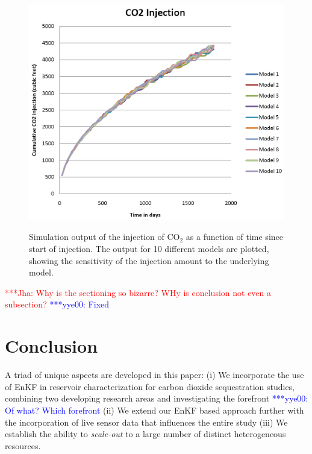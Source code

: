 \documentclass{acm_proc_article-sp}
\newcommand{\jhanote}[1]{ {\textcolor{red} { ***Jha: #1 }}}
\newcommand{\yyenote}[1]{ {\textcolor{blue} { ***yye00: #1 }}}
\newcommand{\jhanote}[1]{}
\newcommand{\yyenote}[1]{}
\begin{document}
\begin{figure}
\begin{center}\
\includegraphics[scale=0.33]{figures/co2seq.png}
\end{center}
\caption[Simulation Output]{Simulation output of the injection of
  CO$_2$ as a function of time since start of injection. The output for 10  different models are
  plotted, showing the sensitivity of the injection amount to the
  underlying model.}
\label{fig:carbon}
\end{figure}


\jhanote{Why is the sectioning so bizarre? WHy is conclusion not even
  a subsection?} \yyenote{Fixed}
\section{Conclusion}
A triad of unique aspects are developed in this
paper: (i) We incorporate the use of EnKF in reservoir
characterization for carbon dioxide sequestration studies, combining
two developing research areas and investigating the forefront \yyenote{Of what? Which forefront}(ii) We
extend our EnKF based approach further with the incorporation of live
sensor data that influences the entire study (iii) We establish the
ability to {\it scale-out} to a large number of distinct heterogeneous
resources.
\end{document}
